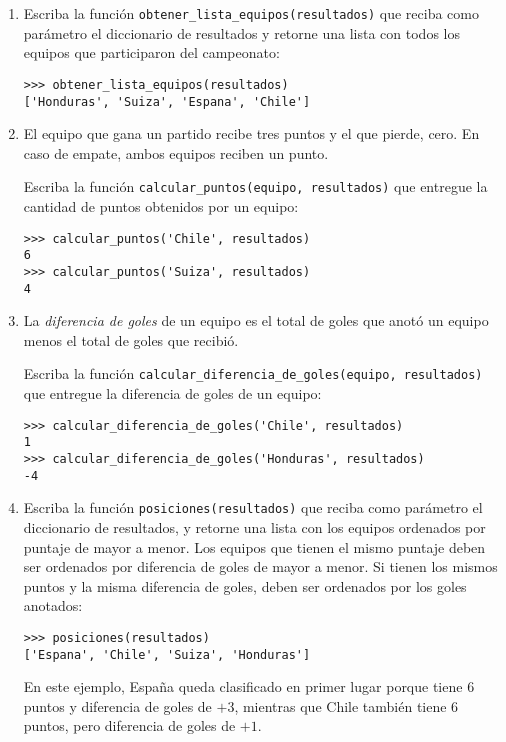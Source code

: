 \begin{enumerate}
\item
  Escriba la función \lstinline!obtener_lista_equipos(resultados)! que
  reciba como parámetro el diccionario de resultados y retorne una lista
  con todos los equipos que participaron del campeonato:

\begin{lstlisting}
>>> obtener_lista_equipos(resultados)
['Honduras', 'Suiza', 'Espana', 'Chile']
\end{lstlisting}
\item
  El equipo que gana un partido recibe tres puntos y el que pierde,
  cero. En caso de empate, ambos equipos reciben un punto.

  Escriba la función \lstinline!calcular_puntos(equipo, resultados)! que
  entregue la cantidad de puntos obtenidos por un equipo:

\begin{lstlisting}
>>> calcular_puntos('Chile', resultados)
6
>>> calcular_puntos('Suiza', resultados)
4
\end{lstlisting}
\item
  La \emph{diferencia de goles} de un equipo es el total de goles que
  anotó un equipo menos el total de goles que recibió.

  Escriba la función
  \lstinline!calcular_diferencia_de_goles(equipo, resultados)! que
  entregue la diferencia de goles de un equipo:

\begin{lstlisting}
>>> calcular_diferencia_de_goles('Chile', resultados)
1
>>> calcular_diferencia_de_goles('Honduras', resultados)
-4
\end{lstlisting}
\item
  Escriba la función \lstinline!posiciones(resultados)! que reciba como
  parámetro el diccionario de resultados, y retorne una lista con los
  equipos ordenados por puntaje de mayor a menor. Los equipos que tienen
  el mismo puntaje deben ser ordenados por diferencia de goles de mayor
  a menor. Si tienen los mismos puntos y la misma diferencia de goles,
  deben ser ordenados por los goles anotados:

\begin{lstlisting}
>>> posiciones(resultados)
['Espana', 'Chile', 'Suiza', 'Honduras']
\end{lstlisting}

  En este ejemplo, España queda clasificado en primer lugar porque tiene
  6 puntos y diferencia de goles de \(+3\), mientras que Chile también tiene
  6 puntos, pero diferencia de goles de \(+1\).
\end{enumerate}
